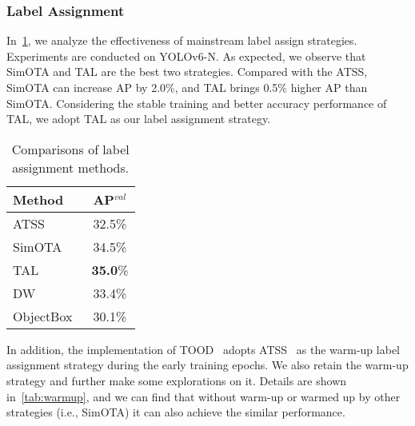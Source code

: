 \documentclass[10pt,twocolumn,letterpaper]{article}
\begin{document}
 
\subsubsection{Label Assignment}
\label{sec:exp:ablate:labelassign}
In~\cref{tab:label_assign}, we analyze the effectiveness of mainstream label assign strategies. Experiments are conducted on YOLOv6-N. As expected, we observe that SimOTA and TAL are the best two strategies. Compared with the ATSS, SimOTA can increase AP by 2.0\%, and TAL brings 0.5\% higher AP than SimOTA. Considering the stable training and better accuracy performance of TAL, we adopt TAL as our label assignment strategy.

 \begin{table}
  \centering
  \begin{tabular}{l|c}
    \toprule
    \textbf{Method} & \textbf{AP$^{val}$} \\
    \midrule
    \midrule
    ATSS~\cite{zhang2020atss} & 32.5\%  \\
    SimOTA~\cite{ge2021yolox} & 34.5\% \\
    TAL~\cite{feng2021tood} & \textbf{35.0}\% \\
    DW~\cite{dw_CVPR} & 33.4\%  \\
    ObjectBox~\cite{Zand2022ObjectBoxFC} & 30.1\% \\
    \bottomrule
  \end{tabular}
  \caption{Comparisons of label assignment methods.}
  \label{tab:label_assign}
\end{table}



In addition, the implementation of TOOD~\cite{feng2021tood} adopts ATSS~\cite{zhang2020atss} as the warm-up label assignment strategy during the early training epochs. We also retain the warm-up strategy and further make some explorations on it. Details are shown in~\cref{tab:warmup}, and we can find that without warm-up or warmed up by other strategies (i.e., SimOTA) it can also achieve the similar performance.

\begin{table}
  \centering
  \caption{Comparisons of label assignment methods in warm-up stage.}
  \label{tab:warmup}
\end{table}
\end{document}
